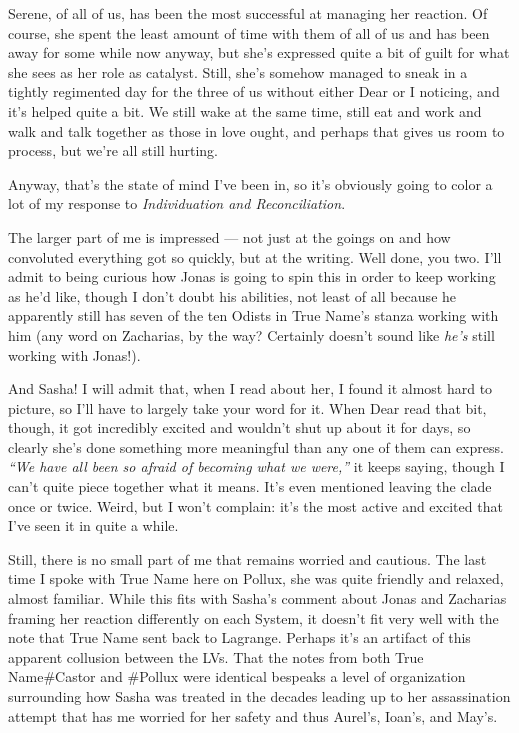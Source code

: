 Serene, of all of us, has been the most successful at managing her reaction. Of course, she spent the least amount of time with them of all of us and has been away for some while now anyway, but she's expressed quite a bit of guilt for what she sees as her role as catalyst. Still, she's somehow managed to sneak in a tightly regimented day for the three of us without either Dear or I noticing, and it's helped quite a bit. We still wake at the same time, still eat and work and walk and talk together as those in love ought, and perhaps that gives us room to process, but we're all still hurting.

Anyway, that's the state of mind I've been in, so it's obviously going to color a lot of my response to \emph{Individuation and Reconciliation}.

The larger part of me is impressed — not just at the goings on and how convoluted everything got so quickly, but at the writing. Well done, you two. I'll admit to being curious how Jonas is going to spin this in order to keep working as he'd like, though I don't doubt his abilities, not least of all because he apparently still has seven of the ten Odists in True Name's stanza working with him (any word on Zacharias, by the way? Certainly doesn't sound like \emph{he's} still working with Jonas!).

And Sasha! I will admit that, when I read about her, I found it almost hard to picture, so I'll have to largely take your word for it. When Dear read that bit, though, it got incredibly excited and wouldn't shut up about it for days, so clearly she's done something more meaningful than any one of them can express. \emph{``We have all been so afraid of becoming what we were,''} it keeps saying, though I can't quite piece together what it means. It's even mentioned leaving the clade once or twice. Weird, but I won't complain: it's the most active and excited that I've seen it in quite a while.

Still, there is no small part of me that remains worried and cautious. The last time I spoke with True Name here on Pollux, she was quite friendly and relaxed, almost familiar. While this fits with Sasha's comment about Jonas and Zacharias framing her reaction differently on each System, it doesn't fit very well with the note that True Name sent back to Lagrange. Perhaps it's an artifact of this apparent collusion between the LVs. That the notes from both True Name\#Castor and \#Pollux were identical bespeaks a level of organization surrounding how Sasha was treated in the decades leading up to her assassination attempt that has me worried for her safety and thus Aurel's, Ioan's, and May's.

